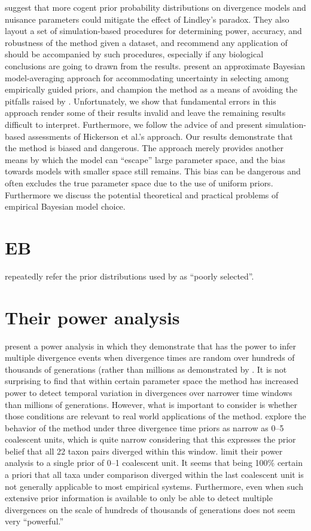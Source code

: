 \documentclass[letterpaper,12pt]{article}
\begin{document}
\begin{linenumbers}
\citet{Oaks2012} suggest that more cogent prior probability distributions on
divergence models and nuisance parameters could mitigate the effect of
Lindley's paradox.
They also layout a set of simulation-based procedures for determining power,
accuracy, and robustness of the method given a dataset, and recommend any
application of \msb should be accompanied by such procedures, especially
if any biological conclusions are going to drawn from the results.
\citet{Hickerson2013} present an approximate Bayesian model-averaging approach
for accommodating uncertainty in selecting among empirically guided priors, and
champion the method as a means of avoiding the pitfalls raised by
\citet{Oaks2012}.
Unfortunately, we show that fundamental errors in this approach render some of
their results invalid and leave the remaining results difficult to interpret.
Furthermore, we follow the advice of \citet{Oaks2012} and present
simulation-based assessments of Hickerson et al.'s \citeyear{Hickerson2013}
approach.
Our results demonstrate that the method is biased and dangerous.
The approach merely provides another means by which the model can ``escape''
large parameter space, and the bias towards models with smaller space still
remains.
This bias can be dangerous and often excludes the true parameter space due to
the use of uniform priors.
Furthermore we discuss the potential theoretical and practical problems of
empirical Bayesian model choice.

\section*{EB}
\citet{Hickerson2013} repeatedly refer the prior distributions used by
\citet{Oaks2012} as ``poorly selected''.

\section*{Their power analysis}
\citet{Hickerson2013} present a power analysis in which they demonstrate that
\msb has the power to infer multiple divergence events when divergence times
are random over hundreds of thousands of generations (rather than millions
as demonstrated by \citet{Oaks2012}.
It is not surprising to find that within certain parameter space the method
has increased power to detect temporal variation in divergences over narrower
time windows than millions of generations.
However, what is important to consider is whether those conditions are relevant
to real world applications of the method.
\citet{Oaks2012} explore the behavior of the method under three divergence time
priors as narrow as 0--5 coalescent units, which is quite narrow considering
that this expresses the prior belief that all 22 taxon pairs diverged within
this window.
\citet{Hickerson2013} limit their power analysis to a single prior of 0--1
coalescent unit.
It seems that being 100\% certain a priori that all taxa under comparison
diverged within the last coalescent unit is not generally applicable to most
empirical systems.
Furthermore, even when such extensive prior information is available to only be
able to detect multiple divergences on the scale of hundreds of thousands of
generations does not seem very ``powerful.''


\end{linenumbers}
\end{document}
